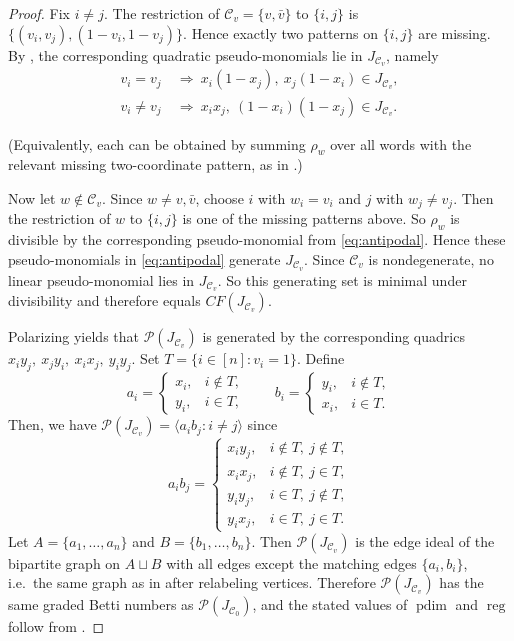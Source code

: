 \documentclass[12pt]{amsart}
\theoremstyle{remark}
\theoremstyle{definition}
\DeclareMathOperator{\reg}{reg}
\DeclareMathOperator{\pd}{pdim}
\newcommand{\C}{\mathcal{C}}
\def\P{{\mathcal P}}
\begin{document}
\begin{proof}
Fix $i\neq j$. The restriction of $\C_v=\{v,\bar v\}$ to $\{i,j\}$ is
$\{(v_i,v_j),(1-v_i,1-v_j)\}$. Hence exactly two patterns on $\{i,j\}$ are missing. By
, the corresponding quadratic pseudo-monomials lie in $J_{\C_v}$, namely
\begin{equation}\label{eq:antipodal}\tag{$\star$}
\begin{aligned}
v_i=v_j \ &\Longrightarrow\ x_i(1-x_j),\ x_j(1-x_i)\in J_{\C_v},\\
v_i\neq v_j \ &\Longrightarrow\ x_ix_j,\ (1-x_i)(1-x_j)\in J_{\C_v}.
\end{aligned}
\end{equation}



(Equivalently, each can be obtained by summing $\rho_w$ over all words with the relevant missing
two-coordinate pattern, as in .)

Now let $w\notin\C_v$. Since $w\neq v,\bar v$, choose $i$ with $w_i=v_i$ and $j$ with $w_j\neq v_j$.
Then the restriction of $w$ to $\{i,j\}$ is one of the missing patterns above. So $\rho_w$ is divisible
by the corresponding  pseudo-monomial from \eqref{eq:antipodal}. Hence these pseudo-monomials in  \eqref{eq:antipodal} generate $J_{\C_v}$. Since $\C_v$ is
nondegenerate, no linear pseudo-monomial lies in $J_{\C_v}$. So this generating set is minimal under
divisibility and therefore equals $CF(J_{\C_v})$.

Polarizing yields that $\P(J_{\C_v})$ is generated by the corresponding quadrics
$x_i y_j,\ x_j y_i,\ x_ix_j,\ y_i y_j$.  Set $T=\{i\in[n]:v_i=1\}$. Define
\[
a_i=\begin{cases}x_i,& i\notin T,\\ y_i,& i\in T,\end{cases}
\qquad
b_i=\begin{cases}y_i,& i\notin T,\\ x_i,& i\in T.\end{cases}
\]
Then, we have  $\P(J_{\C_v})=\langle a_i b_j : i\neq j\rangle$ since 
\[
a_i b_j=
\begin{cases}
x_i y_j, & i\notin T,\ j\notin T,\\
x_i x_j, & i\notin T,\ j\in T,\\
y_i y_j, & i\in T,\ j\notin T,\\
y_i x_j, & i\in T,\ j\in T.
\end{cases}
\]
Let $A=\{a_1,\dots,a_n\}$ and $B=\{b_1,\dots,b_n\}$. Then $\P(J_{\C_v})$ is the edge ideal of the bipartite graph on $A\sqcup B$ with all edges except the
matching edges $\{a_i,b_i\}$, i.e.\ the same graph as in  after relabeling
vertices.  Therefore $\P(J_{\C_v})$ has the same graded Betti numbers as $\P(J_{\C_0})$, and the stated
values of $\pd$ and $\reg$ follow from .
\end{proof}
\end{document}
